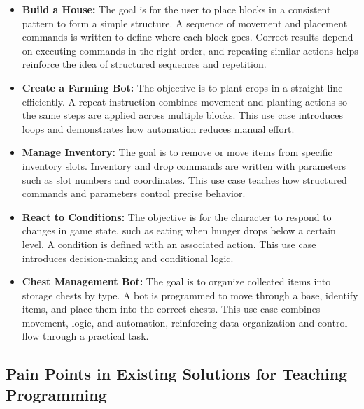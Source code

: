 \begin{itemize}
    \item[\textbf{--}] \textbf{Build a House:}
    The goal is for the user to place blocks in a consistent pattern to form a simple structure. 
    A sequence of movement and placement commands is written to define where each block goes. 
    Correct results depend on executing commands in the right order, and repeating similar actions helps reinforce the idea of structured sequences and repetition.

    \item[\textbf{--}] \textbf{Create a Farming Bot:}
    The objective is to plant crops in a straight line efficiently. 
    A repeat instruction combines movement and planting actions so the same steps are applied across multiple blocks. 
    This use case introduces loops and demonstrates how automation reduces manual effort.

    \item[\textbf{--}] \textbf{Manage Inventory:}
    The goal is to remove or move items from specific inventory slots. 
    Inventory and drop commands are written with parameters such as slot numbers and coordinates. 
    This use case teaches how structured commands and parameters control precise behavior.

    \item[\textbf{--}] \textbf{React to Conditions:}
    The objective is for the character to respond to changes in game state, such as eating when hunger drops below a certain level. 
    A condition is defined with an associated action. 
    This use case introduces decision-making and conditional logic.

    \item[\textbf{--}] \textbf{Chest Management Bot:}
    The goal is to organize collected items into storage chests by type. 
    A bot is programmed to move through a base, identify items, and place them into the correct chests. 
    This use case combines movement, logic, and automation, reinforcing data organization and control flow through a practical task.
\end{itemize}

\subsection{Pain Points in Existing Solutions for Teaching Programming}

